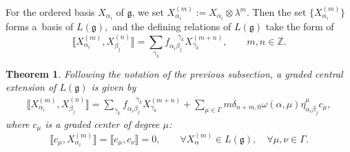 \documentclass[pdftex]{sigma}
\numberwithin{equation}{section}
\newtheorem{Theorem}{Theorem}[section]
\theoremstyle{definition}
\def\g{\mathfrak{g}}
\begin{document}
For the ordered basis $ X_{\alpha_i} $ of $\g$, we set $ X_{\alpha_i}^{(m)} := X_{\alpha_i} \otimes \lambda^{m}$. Then the set $ \bigr\{ X_{\alpha_i}^{(m)}\bigl\}$ forms a~basis of $L(\g), $
and the defining relations of $L(\g)$ take the form of
\begin{equation*}
	\bigl\llbracket X_{\alpha_i}^{(m)}, X_{\beta_j}^{(n)} \bigr\rrbracket = \sum_{\gamma_k} f_{\alpha_i \beta_j}^{\quad\ \gamma_k} X_{\gamma_k}^{(m+n)},
	\qquad m, n \in \mathbb{Z}.
\end{equation*}

\begin{Theorem} \label{THM:centralext}
	Following the notation of the previous subsection, a graded central extension of $L(\g)$ is given by
	\begin{align}
		\bigl\llbracket X_{\alpha_i}^{(m)}, X_{\beta_j}^{(n)}\bigr \rrbracket = \sum_{\gamma_k} f_{\alpha_i \beta_j}^{\quad\ \gamma_k} X_{\gamma_k}^{(m+n)}
		+ \sum_{\mu\in \Gamma} m \delta_{n+m,0} \omega(\alpha,\mu) \eta^{\mu}_{\alpha_i \beta_j} c_{\mu},
		\label{comWc}
	\end{align}
	where $ c_{\mu}$ is a graded center of degree $\mu$:
	\begin{equation*}
		\bigl\llbracket c_{\mu}, X_{\alpha_i}^{(m)} \bigr\rrbracket = \llbracket c_{\mu}, c_{\nu} \rrbracket = 0, \qquad \forall X_{\alpha}^{(m)} \in L(\g), \quad \forall \mu, \nu \in \Gamma.
	\end{equation*}
\end{Theorem}
\end{document}
